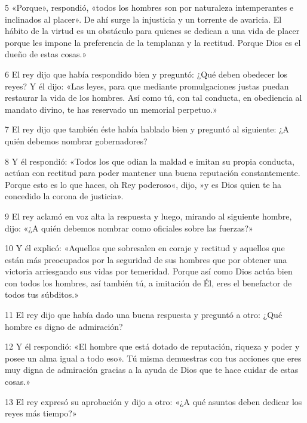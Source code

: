 \par 5 «Porque», respondió, «todos los hombres son por naturaleza intemperantes e inclinados al placer». De ahí surge la injusticia y un torrente de avaricia. El hábito de la virtud es un obstáculo para quienes se dedican a una vida de placer porque les impone la preferencia de la templanza y la rectitud. Porque Dios es el dueño de estas cosas.»

\par 6 El rey dijo que había respondido bien y preguntó: ¿Qué deben obedecer los reyes? Y él dijo: «Las leyes, para que mediante promulgaciones justas puedan restaurar la vida de los hombres. Así como tú, con tal conducta, en obediencia al mandato divino, te has reservado un memorial perpetuo.»

\par 7 El rey dijo que también éste había hablado bien y preguntó al siguiente: ¿A quién debemos nombrar gobernadores?

\par 8 Y él respondió: «Todos los que odian la maldad e imitan su propia conducta, actúan con rectitud para poder mantener una buena reputación constantemente. Porque esto es lo que haces, oh Rey poderoso«, dijo, »y es Dios quien te ha concedido la corona de justicia».

\par 9 El rey aclamó en voz alta la respuesta y luego, mirando al siguiente hombre, dijo: «¿A quién debemos nombrar como oficiales sobre las fuerzas?»

\par 10 Y él explicó: «Aquellos que sobresalen en coraje y rectitud y aquellos que están más preocupados por la seguridad de sus hombres que por obtener una victoria arriesgando sus vidas por temeridad. Porque así como Dios actúa bien con todos los hombres, así también tú, a imitación de Él, eres el benefactor de todos tus súbditos.»

\par 11 El rey dijo que había dado una buena respuesta y preguntó a otro: ¿Qué hombre es digno de admiración?

\par 12 Y él respondió: «El hombre que está dotado de reputación, riqueza y poder y posee un alma igual a todo eso». Tú misma demuestras con tus acciones que eres muy digna de admiración gracias a la ayuda de Dios que te hace cuidar de estas cosas.»

\par 13 El rey expresó su aprobación y dijo a otro: «¿A qué asuntos deben dedicar los reyes más tiempo?»

